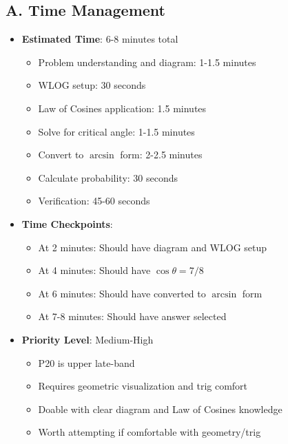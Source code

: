 \documentclass[12pt]{article}
\begin{document}
\begin{competitionbox}
\subsection*{A. Time Management}
\begin{itemize}[leftmargin=*]
    \item \textbf{Estimated Time}: 6-8 minutes total
    \begin{itemize}
        \item Problem understanding and diagram: 1-1.5 minutes
        \item WLOG setup: 30 seconds
        \item Law of Cosines application: 1.5 minutes
        \item Solve for critical angle: 1-1.5 minutes
        \item Convert to $\arcsin$ form: 2-2.5 minutes
        \item Calculate probability: 30 seconds
        \item Verification: 45-60 seconds
    \end{itemize}
    \item \textbf{Time Checkpoints}: 
    \begin{itemize}
        \item At 2 minutes: Should have diagram and WLOG setup
        \item At 4 minutes: Should have $\cos\theta = 7/8$
        \item At 6 minutes: Should have converted to $\arcsin$ form
        \item At 7-8 minutes: Should have answer selected
    \end{itemize}
    \item \textbf{Priority Level}: Medium-High
    \begin{itemize}
        \item P20 is upper late-band
        \item Requires geometric visualization and trig comfort
        \item Doable with clear diagram and Law of Cosines knowledge
        \item Worth attempting if comfortable with geometry/trig
    \end{itemize}
\end{itemize}


\end{competitionbox}
\end{document}
